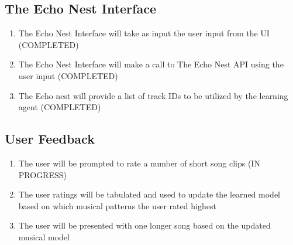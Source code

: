 \documentclass{article}
\begin{document}
\subsection{The Echo Nest Interface}
\begin{enumerate}
\item The Echo Nest Interface will take as input the user input from the UI (COMPLETED)
\item The Echo Nest Interface will make a call to The Echo Nest API using the user input (COMPLETED)
\item The Echo nest will provide a list of track IDs to be utilized by the learning agent (COMPLETED)
\end{enumerate}

\subsection{User Feedback}
\begin{enumerate}
<<<<<<< HEAD
\Large{TODO: we aren't doing any of this any more, are we?}
=======
>>>>>>> 764473f4f38c9c273c07147afa2c6f0b99e595ce
\item The user will be prompted to rate a number of short song clips (IN PROGRESS)
\item The user ratings will be tabulated and used to update the learned model based on which musical patterns the user rated highest
\item The user will be presented with one longer song based on the updated musical model
\end{enumerate}
\end{document}
